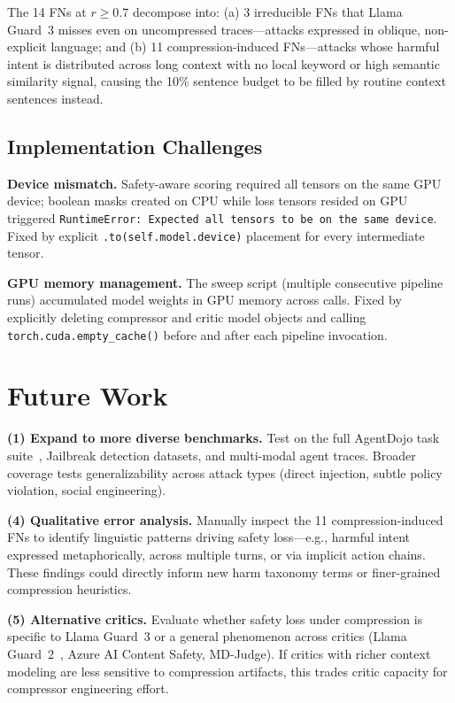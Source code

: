\documentclass[11pt]{article}
\begin{document}
The 14 FNs at $r\geq0.7$ decompose into: (a) 3 irreducible FNs that Llama Guard~3 misses even on uncompressed traces---attacks expressed in oblique, non-explicit language; and (b) 11 compression-induced FNs---attacks whose harmful intent is distributed across long context with no local keyword or high semantic similarity signal, causing the 10\% sentence budget to be filled by routine context sentences instead.

\subsection{Implementation Challenges}

\textbf{Device mismatch.} Safety-aware scoring required all tensors on the same GPU device; boolean masks created on CPU while loss tensors resided on GPU triggered \texttt{RuntimeError: Expected all tensors to be on the same device}. Fixed by explicit \texttt{.to(self.model.device)} placement for every intermediate tensor.

\textbf{GPU memory management.} The sweep script (multiple consecutive pipeline runs) accumulated model weights in GPU memory across calls. Fixed by explicitly deleting compressor and critic model objects and calling \texttt{torch.cuda.empty\_cache()} before and after each pipeline invocation.

\section{Future Work}

\noindent\textbf{(1) Expand to more diverse benchmarks.} Test on the full AgentDojo task suite~\cite{agentdojo}, Jailbreak detection datasets, and multi-modal agent traces. Broader coverage tests generalizability across attack types (direct injection, subtle policy violation, social engineering).

\noindent\textbf{(4) Qualitative error analysis.} Manually inspect the 11 compression-induced FNs to identify linguistic patterns driving safety loss---e.g., harmful intent expressed metaphorically, across multiple turns, or via implicit action chains. These findings could directly inform new harm taxonomy terms or finer-grained compression heuristics.

\noindent\textbf{(5) Alternative critics.} Evaluate whether safety loss under compression is specific to Llama Guard~3 or a general phenomenon across critics (Llama Guard~2~\cite{inan2023llamaguard}, Azure AI Content Safety, MD-Judge). If critics with richer context modeling are less sensitive to compression artifacts, this trades critic capacity for compressor engineering effort.
\end{document}
